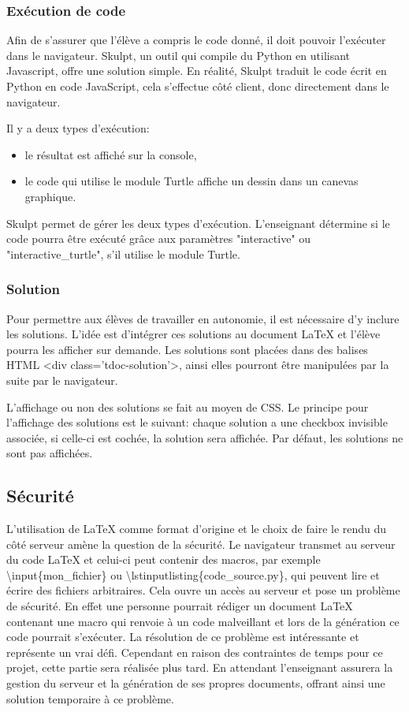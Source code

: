 \documentclass[12pt,titlepage,oneside]{article}
\renewcommand{\footnote}[1]{}
\begin{document}
\subsubsection{Exécution de code}
Afin de s'assurer que l'élève a compris le code donné, il doit pouvoir l'exécuter dans le navigateur. Skulpt\footnote{\url{https://skulpt.org/}}, un outil qui compile du Python en utilisant Javascript, offre une solution simple. En réalité, Skulpt traduit le code écrit en Python en code JavaScript, cela s'effectue côté client, donc directement dans le navigateur. \par
Il y a deux types d'exécution:
\begin{itemize}
\item le résultat est affiché sur la console,
\item le code qui utilise le module Turtle\footnote{\url{https://docs.python.org/3/library/turtle.html}} affiche un dessin dans un canevas graphique.
\end{itemize}
Skulpt permet de gérer les deux types d'exécution. L'enseignant détermine si le code pourra être exécuté grâce aux paramètres "interactive" ou "interactive\_turtle", s'il utilise le module Turtle.

\subsubsection{Solution}
Pour permettre aux élèves de travailler en autonomie, il est nécessaire d'y inclure les solutions. L'idée est d'intégrer ces solutions au document LaTeX et l'élève pourra les afficher sur demande. Les solutions sont placées dans des balises HTML <div class='tdoc-solution'>, ainsi elles pourront être manipulées par la suite par le navigateur.\par

L'affichage ou non des solutions se fait au moyen de CSS. Le principe pour l'affichage des solutions est le suivant: chaque solution a une checkbox invisible associée, si celle-ci est cochée, la solution sera affichée. Par défaut, les solutions ne sont pas affichées.

\subsection{Sécurité}
L'utilisation de LaTeX comme format d'origine et le choix de faire le rendu du côté serveur amène la question de la sécurité. Le navigateur transmet au serveur du code LaTeX et celui-ci peut contenir des macros, par exemple \textbackslash input\{mon\_fichier\} ou \textbackslash lstinputlisting\{code\_source.py\},  qui peuvent lire et écrire des fichiers arbitraires. Cela ouvre un accès au serveur et pose un problème de sécurité. En effet une personne pourrait rédiger un document LaTeX contenant une macro qui renvoie à un code malveillant et lors de la génération ce code pourrait s'exécuter. La résolution de ce problème est intéressante et représente un vrai défi. Cependant en raison des contraintes de temps pour ce projet, cette partie sera réalisée plus tard. En attendant l'enseignant assurera la gestion du serveur et la génération de ses propres documents, offrant ainsi une solution temporaire à ce problème.
\end{document}

